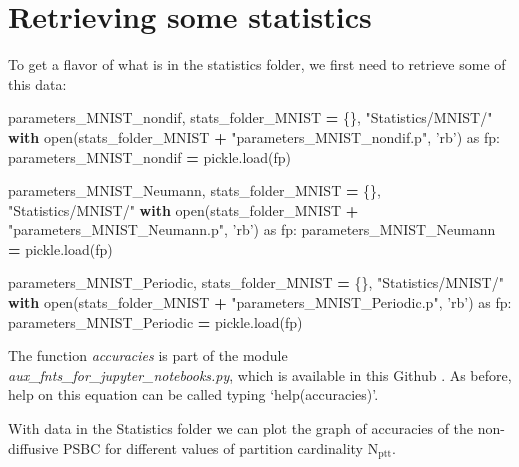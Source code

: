 \documentclass[openany,twoside]{book}
\newenvironment{Shaded}{\begin{snugshade}}{\end{snugshade}}
\newcommand{\BuiltInTok}[1]{#1}
\newcommand{\ControlFlowTok}[1]{\textcolor[rgb]{0.13,0.29,0.53}{\textbf{#1}}}
\newcommand{\ImportTok}[1]{#1}
\newcommand{\NormalTok}[1]{#1}
\newcommand{\OperatorTok}[1]{\textcolor[rgb]{0.81,0.36,0.00}{\textbf{#1}}}
\newcommand{\StringTok}[1]{\textcolor[rgb]{0.31,0.60,0.02}{#1}}
\begin{document}
\hypertarget{retrieving-some-statistics}{%
\section{Retrieving some statistics}\label{retrieving-some-statistics}}

To get a flavor of what is in the statistics folder, we first need to retrieve some of this data:

\begin{Shaded}
\begin{Highlighting}[]
\NormalTok{parameters_MNIST_nondif, stats_folder_MNIST }\OperatorTok{=}\NormalTok{ \{\}, }\StringTok{"Statistics/MNIST/"}
\ControlFlowTok{with} \BuiltInTok{open}\NormalTok{(stats_folder_MNIST }\OperatorTok{+} \StringTok{"parameters_MNIST_nondif.p"}\NormalTok{, }\StringTok{'rb'}\NormalTok{) }\ImportTok{as}\NormalTok{ fp: }
\NormalTok{    parameters_MNIST_nondif }\OperatorTok{=}\NormalTok{ pickle.load(fp)}

\NormalTok{parameters_MNIST_Neumann, stats_folder_MNIST }\OperatorTok{=}\NormalTok{ \{\}, }\StringTok{"Statistics/MNIST/"}
\ControlFlowTok{with} \BuiltInTok{open}\NormalTok{(stats_folder_MNIST }\OperatorTok{+} \StringTok{"parameters_MNIST_Neumann.p"}\NormalTok{, }\StringTok{'rb'}\NormalTok{) }\ImportTok{as}\NormalTok{ fp:}
\NormalTok{        parameters_MNIST_Neumann }\OperatorTok{=}\NormalTok{ pickle.load(fp)}

\NormalTok{parameters_MNIST_Periodic, stats_folder_MNIST }\OperatorTok{=}\NormalTok{ \{\}, }\StringTok{"Statistics/MNIST/"}
\ControlFlowTok{with} \BuiltInTok{open}\NormalTok{(stats_folder_MNIST }\OperatorTok{+} \StringTok{"parameters_MNIST_Periodic.p"}\NormalTok{, }\StringTok{'rb'}\NormalTok{) }\ImportTok{as}\NormalTok{ fp:}
\NormalTok{        parameters_MNIST_Periodic }\OperatorTok{=}\NormalTok{ pickle.load(fp)}
\end{Highlighting}
\end{Shaded}

The function \emph{accuracies} is part of the module \emph{aux\_fnts\_for\_jupyter\_notebooks.py}, which is available in this Github \citep{Bin_phase_github}. As before, help on this equation can be called typing `help(accuracies)'.

With data in the Statistics folder we can plot the graph of accuracies of the non-diffusive PSBC for different values of partition cardinality \(\mathrm{N_{ptt}}\).
\end{document}
